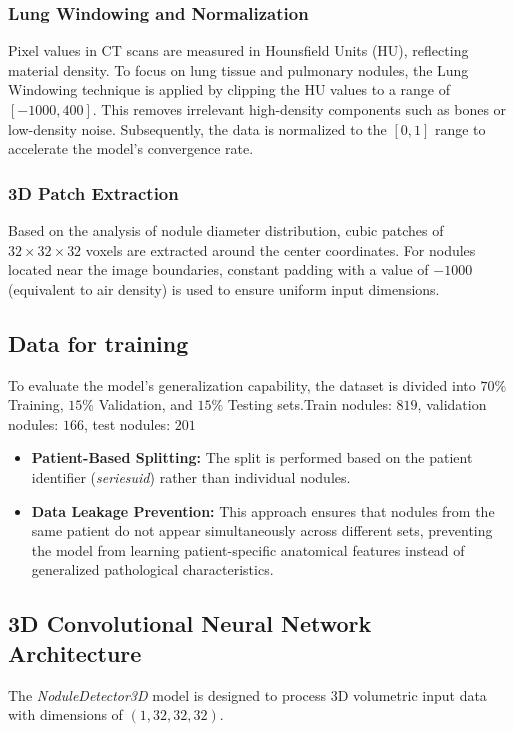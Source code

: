 \documentclass[a4paper, 10pt, twocolumn]{article}
\begin{document}
\subsubsection{Lung Windowing and Normalization}
Pixel values in CT scans are measured in Hounsfield Units (HU), reflecting material density. To focus on lung tissue and pulmonary nodules, the Lung Windowing technique is applied by clipping the HU values to a range of $[-1000, 400]$. This removes irrelevant high-density components such as bones or low-density noise. Subsequently, the data is normalized to the $[0, 1]$ range to accelerate the model's convergence rate.

\subsubsection{3D Patch Extraction}
Based on the analysis of nodule diameter distribution, cubic patches of $32 \times 32 \times 32$ voxels are extracted around the center coordinates. For nodules located near the image boundaries, constant padding with a value of $-1000$ (equivalent to air density) is used to ensure uniform input dimensions.

\subsection{Data for training}
To evaluate the model's generalization capability, the dataset is divided into $70\%$ Training, $15\%$ Validation, and $15\%$ Testing sets.Train nodules: $819$, 
validation nodules: $166$, 
test nodules: $201$ 
\begin{itemize}
    \item \textbf{Patient-Based Splitting:} The split is performed based on the patient identifier (\textit{seriesuid}) rather than individual nodules.
    \item \textbf{Data Leakage Prevention:} This approach ensures that nodules from the same patient do not appear simultaneously across different sets, preventing the model from learning patient-specific anatomical features instead of generalized pathological characteristics.
\end{itemize}

\subsection{3D Convolutional Neural Network Architecture}
The \textit{NoduleDetector3D} model is designed to process 3D volumetric input data with dimensions of $(1, 32, 32, 32)$.
\end{document}
